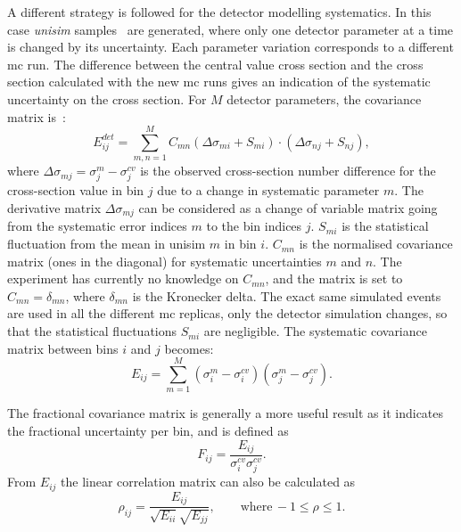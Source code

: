 A different strategy is followed for the detector modelling systematics. In this case \emph{unisim} samples~\cite{roe} are generated, where only one detector parameter at a time is changed by its uncertainty. Each parameter variation corresponds to a different \acrshort{mc} run. The difference between the central value cross section and the cross section calculated with the new \acrshort{mc} runs gives an indication of the systematic uncertainty on the cross section. For $M$ detector parameters, the covariance matrix is~\cite{roe}:
\begin{equation}
\label{eq:cov_det}
E_{ij}^{det} = \sum_{m,n = 1}^{M} C_{mn} (\Delta\sigma_{mi} + S_{mi}) \cdot (\Delta\sigma_{nj} + S_{nj}),
\end{equation}
where $\Delta\sigma_{mj} = \sigma_j^m - \sigma_j^{cv}$ is the observed cross-section number difference for the cross-section value in bin $j$ due to a change in systematic parameter $m$. The derivative matrix $\Delta\sigma_{mj}$ can be considered as a change of variable matrix going from the systematic error indices $m$ to the bin indices $j$. $S_{mi}$ is the statistical fluctuation from the mean in unisim $m$ in  bin $i$. $C_{mn}$ is the normalised covariance matrix (ones in the diagonal) for systematic uncertainties $m$ and $n$.
The experiment has currently no knowledge on $C_{mn}$, and the matrix is set to $C_{mn} = \delta_{mn}$, where $\delta_{mn}$ is the Kronecker delta. The exact same \g simulated events are used in all the different \acrshort{mc} replicas, only the detector simulation changes, so that the statistical fluctuations $S_{mi}$ are negligible. The systematic covariance matrix between bins $i$ and $j$ becomes:
\begin{equation}
\label{eq:syst_det}
E_{ij} = \sum_{m = 1}^{M} (\sigma_i^m - \sigma_i^{cv})(\sigma_j^m - \sigma_j^{cv}).
\end{equation}

The fractional covariance matrix is generally a more useful result as it indicates the fractional uncertainty per bin, and is defined as
\begin{equation}
\label{eq:cov_frac}
F_{ij} = \frac{E_{ij}}{\sigma_i^{cv}\sigma_j^{cv}}.
\end{equation}
From $E_{ij}$ the linear correlation matrix can also be calculated as 
\begin{equation}
\label{eq:corr}
\rho_{ij} = \frac{E_{ij}}{\sqrt{E_{ii}}\sqrt{E_{jj}}}, \qquad \text{where}\, -1 \leqslant \rho \leqslant 1.
\end{equation}

